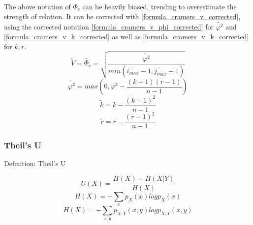 \documentclass[a4paper,12pt]{report}
\begin{document}
The above notation of $\Phi_c$ can be heavily biased, trending to overestimate the strength of relation. It can be corrected with \ref{formula_cramers_v_corrected}, using the corrected notation \ref{formula_cramers_v_phi_corrected} for $\tilde{\varphi^2}$ and \ref{formula_cramers_v_k_corrected} as well as \ref{formula_cramers_v_k_corrected} for $k,r$. \cite{Bergsma2013}
\smallskip
\begin{equation}
\label{formula_cramers_v_corrected}
	\tilde{V} = \tilde{\Phi_c} = \sqrt{\frac{\tilde{\varphi^2}}{min(\tilde{i_{max}}-1,\tilde{j_{max}}-1)}}
\end{equation}
\begin{equation}
\label{formula_cramers_v_phi_corrected}
	\tilde{\varphi^2} = max(0,\varphi^2 - \frac{(k-1)(r-1)}{n-1})
\end{equation}
\begin{equation}
\label{formula_cramers_v_k_corrected}
	\tilde{k} = k - \frac{(k-1)^2}{n-1}
\end{equation}
\begin{equation}
\label{formula_cramers_v_r_corrected}
	\tilde{r} = r - \frac{(r-1)^2}{n-1}
\end{equation}

\bigskip

\subsubsection{Theil’s U}

Definition: Theil’s U


\smallskip
\begin{equation}
\label{formula_theils}
	U(X) = \frac{H(X)-H(X|Y)}{H(X)}
\end{equation}
\begin{equation}
\label{formula_theils_hx}
	H(X) = -\sum_{x} p_{X}(x)log p_X(x)
\end{equation}
\begin{equation}
\label{formula_theils_hxy}
	H(X) = -\sum_{x,y} p_{X,Y}(x,y)log p_{X,Y}(x,y)
\end{equation}

\end{document}
